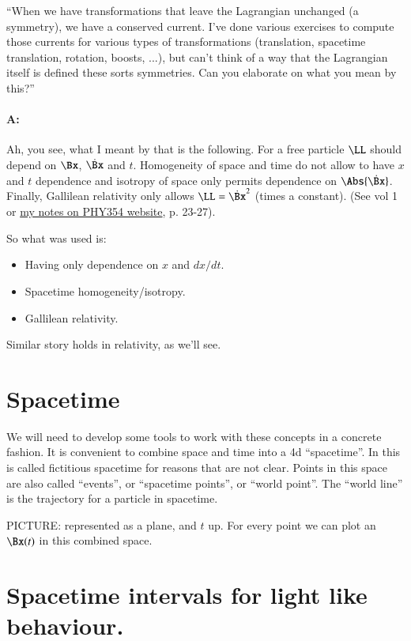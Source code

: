 ``When we have transformations that leave the Lagrangian unchanged (a symmetry), we have a conserved current.  I've done various exercises to compute those currents for various types of transformations (translation, spacetime translation, rotation, boosts, ...), but can't think of a way that the Lagrangian itself is defined these sorts symmetries.  Can you elaborate on what you mean by this?''

\paragraph{A:}

Ah, you see, what I meant by that is the following. For a free particle $\LL$ should depend on $\Bx$, $\dot{\Bx}$ and $t$.  Homogeneity of space and time do not allow to have $x$ and $t$ dependence and isotropy of space only permits dependence on $\Abs{\dot{\Bx}}$. Finally, Gallilean relativity only allows $\LL = \dot{\Bx}^2$ (times a constant). (See \cite{landau1960classical} vol 1 or \href{http://www.physics.utoronto.ca/~poppitz/epoppitz/PHY354_files/CMpp13.1-27.pdf}{my notes on PHY354 website}, p. 23-27).

So what was used is:

\begin{itemize}
\item Having only dependence on $x$ and $dx/dt$.
\item Spacetime homogeneity/isotropy.
\item Gallilean relativity.
\end{itemize}

Similar story holds in relativity, as we'll see. 

\section{Spacetime}

We will need to develop some tools to work with these concepts in a concrete fashion.  It is convenient to combine space  and time  into a 4d ``spacetime''.  In \cite{landau1980classical} this is called fictitious spacetime for reasons that are not clear.  Points in this space are also called ``events'', or ``spacetime points'', or ``world point''.  The ``world line'' is the trajectory for a particle in spacetime.

PICTURE:  represented as a plane, and $t$ up.  For every point we can plot an $\Bx(t)$ in this combined space.

\section{Spacetime intervals for light like behaviour.}

